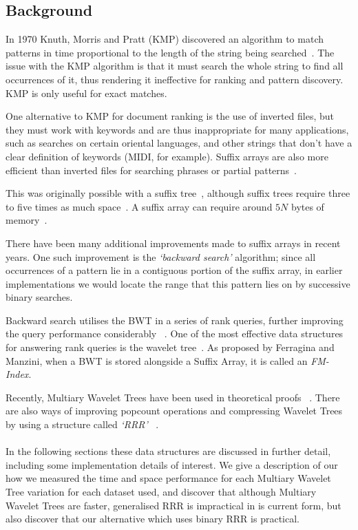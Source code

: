 \subsection{Background}
In 1970 Knuth, Morris and Pratt (KMP) discovered an algorithm to match patterns 
in time proportional to the length of the string being searched~\cite{KMP77, 
McCreight76}. The
issue with the KMP algorithm is that it must search the whole string to find all
occurrences of it, thus rendering it ineffective for ranking and pattern
discovery. KMP is only useful for exact matches.

One alternative to KMP for document ranking is the use of inverted files, but
they must work with keywords and are thus inappropriate for many applications,
such as searches on certain oriental languages, and other strings that don't
have a clear definition of keywords (MIDI, for example). Suffix arrays are also 
more efficient than inverted files for searching phrases or partial 
patterns~\cite{marin2003}.

This was originally
possible with a suffix tree~\cite{McCreight76}, although suffix trees require
three to five times as much space~\cite{manber1993}. A suffix array can require
around $5N$ bytes of memory~\cite{manber1993}.

There have been many additional improvements made to suffix arrays
in recent years. One such improvement is the \emph{`backward search'} 
algorithm;
since all occurrences of a pattern lie in a contiguous portion of the suffix
array, in earlier implementations we would locate the range that this pattern
lies on by successive binary searches. 

Backward search utilises the BWT in a series of rank queries, further
improving the query performance considerably ~\cite{CN08, FGM09, FMMN07, GMR06,
MN07:rankselect, MN07:selfindex, marin2003, MN06}. One of the most effective data
structures for answering rank queries is the wavelet tree~\cite{CN08, FGM09,
FMMN07, GGV03, MN07:selfindex}. As proposed by Ferragina and Manzini, when a BWT 
is stored alongside a Suffix Array, it is called an 
\emph{FM-Index}\cite{fmindex:ferragina2000}.

Recently, Multiary Wavelet Trees have been used in theoretical proofs
~\cite{FMMN07, yu2009}. There are also ways of improving popcount operations and
compressing Wavelet Trees by using a structure called \emph{`RRR'}
~\cite{rrr2007}.
\\ \\
In the following sections these data structures are discussed in further detail,
including some implementation details of interest. We give a description of our
how we measured the time and space performance for each Multiary Wavelet Tree 
variation for each dataset used, and discover that although Multiary Wavelet 
Trees are faster, generalised RRR is impractical in is current form, but also 
discover that our alternative which uses binary RRR is practical.
